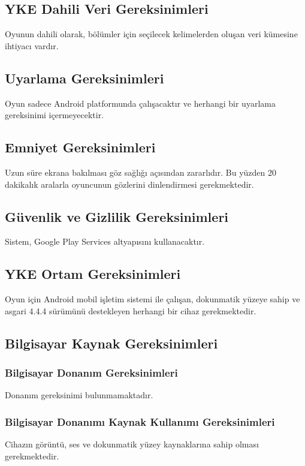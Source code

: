 \documentclass[12pt,a4paper]{article}
\begin{document}
   \subsection{YKE Dahili Veri Gereksinimleri}
   Oyunun dahili olarak, bölümler için seçilecek kelimelerden oluşan veri kümesine ihtiyacı vardır.

   \subsection{Uyarlama Gereksinimleri}
   Oyun sadece Android platformunda çalışacaktır ve herhangi bir uyarlama gereksinimi içermeyecektir.

   \subsection{Emniyet Gereksinimleri}
   Uzun süre ekrana bakılması göz sağlığı açısından zararlıdır. Bu yüzden 20 dakikalık aralarla oyuncunun gözlerini dinlendirmesi gerekmektedir.

   \subsection{Güvenlik ve Gizlilik Gereksinimleri}
   Sistem, Google Play Services altyapısını kullanacaktır. 

   \subsection{YKE Ortam Gereksinimleri} \label{ortam}
   Oyun için Android mobil işletim sistemi ile çalışan, dokunmatik yüzeye sahip ve asgari 4.4.4 sürümünü destekleyen herhangi bir cihaz gerekmektedir.

   \subsection{Bilgisayar Kaynak Gereksinimleri}
   \subsubsection{Bilgisayar Donanım Gereksinimleri}
   Donanım gereksinimi bulunmamaktadır.

   \subsubsection{Bilgisayar Donanımı Kaynak Kullanımı Gereksinimleri}
   Cihazın görüntü, ses ve dokunmatik yüzey kaynaklarına sahip olması gerekmektedir.
\end{document}
